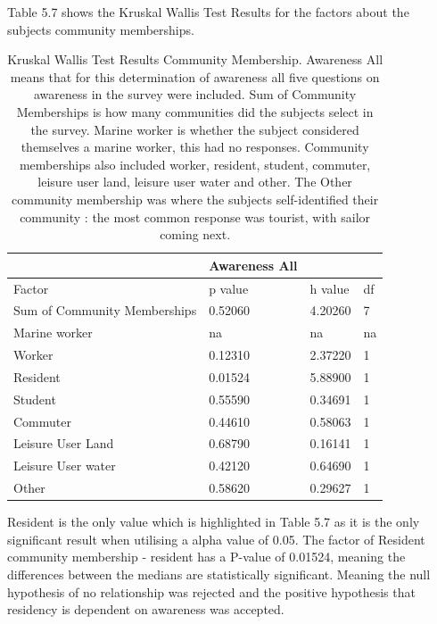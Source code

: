Table 5.7 shows the Kruskal Wallis Test Results for the factors about the subjects community memberships. 


\begin{table}[H]
    \centering
    \begin{tabular}{|l|l|l|l|}
    \hline
         ~ & \textbf{Awareness All} & ~ & ~ \\ \hline
        Factor & p value & h value & df \\ \hline
        Sum of Community Memberships & 0.52060 & 4.20260 & 7 \\ \hline
        Marine worker & na & na & na \\ \hline
        Worker & 0.12310 & 2.37220 & 1 \\ \hline
        Resident & \cellcolor[HTML]{7df9ff} 0.01524 & 5.88900 & 1 \\ \hline
        Student & 0.55590 & 0.34691 & 1 \\ \hline
        Commuter & 0.44610 & 0.58063 & 1 \\ \hline
        Leisure User Land & 0.68790 & 0.16141 & 1 \\ \hline
        Leisure User water & 0.42120 & 0.64690 & 1 \\ \hline
        Other & 0.58620 & 0.29627 & 1 \\ \hline
    \end{tabular}
    \caption{Kruskal Wallis Test Results Community Membership. Awareness All means that for this determination of awareness all five questions on awareness in the survey were included. Sum of Community Memberships is how many communities did the subjects select in the survey. Marine worker is whether the subject considered themselves a marine worker, this had no responses. Community memberships also included worker, resident, student, commuter, leisure user land, leisure user water and other. The Other community membership was where the subjects self-identified their community : the most common response was tourist, with sailor coming next. }
    \label{Kruskal_wallis_test_general}
\end{table}
Resident is the only value which is highlighted in Table 5.7 as it is the only significant result when utilising a alpha value of 0.05. The factor of Resident community membership - resident has a P-value of 0.01524, meaning the differences between the medians are statistically significant. Meaning the null hypothesis of no relationship was rejected and the positive hypothesis that residency is dependent on awareness was accepted. 
\paragraph{}

